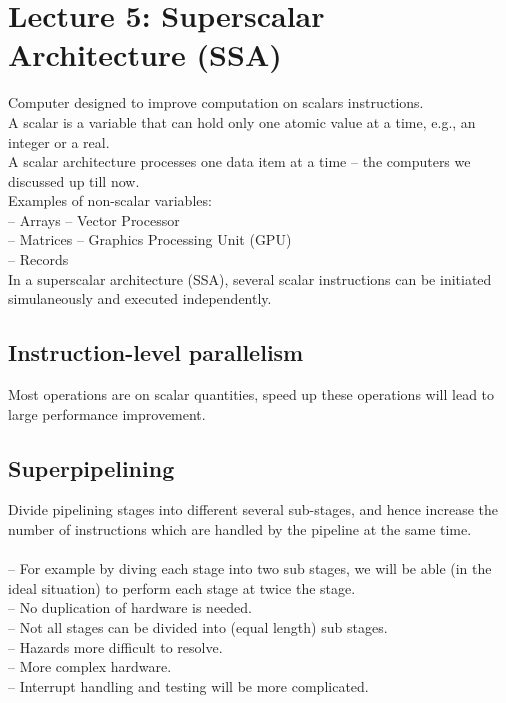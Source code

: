 \section{Lecture 5: Superscalar Architecture (SSA)}
Computer designed to improve computation on scalars instructions. \\
A scalar is a variable that can hold only one atomic value at a time, e.g., an integer or a real. \\
A scalar architecture processes one data item at a time -- the computers we discussed up till now. \\
Examples of non-scalar variables: \\
-- Arrays -- Vector Processor \\
-- Matrices -- Graphics Processing Unit (GPU) \\
-- Records \\

In a superscalar architecture (SSA), several scalar instructions can be initiated simulaneously and executed independently.

\subsection{Instruction-level parallelism}
Most operations are on scalar quantities, speed up these operations will lead to large performance improvement.

\subsection{Superpipelining}
Divide pipelining stages into different several sub-stages, and hence increase the number of instructions which are handled by the pipeline at the same time. \\
 \\

-- For example by diving each stage into two sub stages, we will be able (in the ideal situation) to perform each stage at twice the stage. \\
-- No duplication of hardware is needed. \\
-- Not all stages can be divided into (equal length) sub stages. \\
-- Hazards more difficult to resolve. \\
-- More complex hardware. \\
-- Interrupt handling and testing will be more complicated. \\

